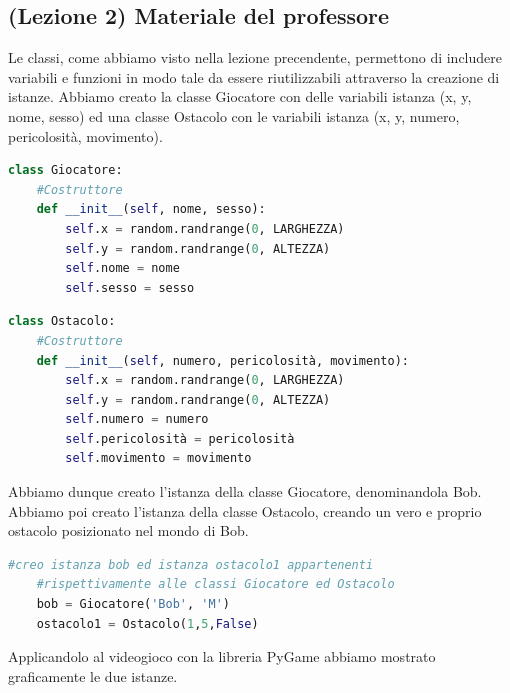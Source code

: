 \documentclass[12pt,a4paper]{article}
\begin{document}
\newpage
\subsection{(Lezione 2) Materiale del professore}

Le classi, come abbiamo visto nella lezione precendente, permettono di includere variabili e funzioni in modo tale da essere riutilizzabili attraverso la creazione di istanze. Abbiamo creato la classe Giocatore con delle variabili istanza (x, y, nome, sesso) ed una classe Ostacolo con le variabili istanza (x, y, numero, pericolosità, movimento).


\begin{lstlisting}[language=Python, caption=Classe Giocatore]
class Giocatore:
    #Costruttore
    def __init__(self, nome, sesso):
        self.x = random.randrange(0, LARGHEZZA)
        self.y = random.randrange(0, ALTEZZA)
        self.nome = nome
        self.sesso = sesso
\end{lstlisting}

\begin{lstlisting}[language=Python, caption=Classe Ostacolo]
class Ostacolo:
    #Costruttore
    def __init__(self, numero, pericolosità, movimento):
        self.x = random.randrange(0, LARGHEZZA)
        self.y = random.randrange(0, ALTEZZA)
        self.numero = numero
        self.pericolosità = pericolosità
        self.movimento = movimento
\end{lstlisting}
Abbiamo dunque creato l'istanza della classe Giocatore, denominandola Bob. Abbiamo poi creato l'istanza della classe Ostacolo, creando un vero e proprio ostacolo posizionato nel mondo di Bob.


\begin{lstlisting}[language=Python, caption=Istanze delle classi]
    #creo istanza bob ed istanza ostacolo1 appartenenti
    #rispettivamente alle classi Giocatore ed Ostacolo
    bob = Giocatore('Bob', 'M')
    ostacolo1 = Ostacolo(1,5,False)
\end{lstlisting}

Applicandolo al videogioco con la libreria PyGame abbiamo mostrato graficamente le due istanze.
\end{document}
